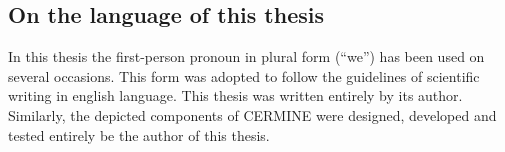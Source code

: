 \subsection{On the language of this thesis}
In this thesis the first-person pronoun in plural form (``we'') has been used on several occasions. This form was adopted to follow the guidelines of scientific writing in english language. This thesis was written entirely by its author. Similarly, the depicted components of CERMINE were designed, developed and tested entirely be the author of this thesis. 
